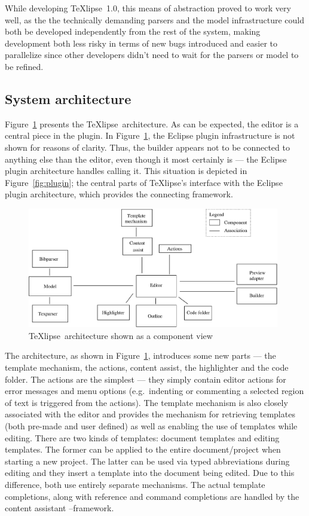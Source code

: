\documentclass[a4paper,11pt,twoside]{article}
\newcommand{\texlipse}{\TeX lipse}
\begin{document}
While developing \texlipse\ 1.0, this means of abstraction proved to work very
well, as the the technically demanding parsers and the model infrastructure
could both be developed independently from the rest of the system, making
development both less risky in terms of new bugs introduced and easier to
parallelize since other developers didn't need to wait for the parsers or model
to be refined.


\subsection{System architecture}

Figure~\ref{fig:arch} presents the \texlipse\ architecture. As can be expected, 
the editor is a central piece in the plugin. In Figure~\ref{fig:arch}, the 
Eclipse plugin infrastructure is not shown for reasons of clarity. Thus, the 
builder appears not to be connected to anything else than the editor, even 
though it most certainly is --- the Eclipse plugin architecture handles calling 
it. This situation is depicted in Figure~\ref{fig:plugin}; the central parts of 
\texlipse's interface with the Eclipse plugin architecture, which provides the 
connecting framework.

\begin{figure}[!htp]
\begin{center}
\includegraphics[width=11cm]{images/architecture}
\caption{\texlipse\ architecture shown as a component view}
\label{fig:arch}
\end{center}
\end{figure} 

The architecture, as shown in Figure~\ref{fig:arch}, introduces some new parts 
--- the template mechanism, the actions, content assist, the highlighter and 
the code folder. The actions are the simplest --- they simply contain editor 
actions for error messages and menu options (e.g.\ indenting or commenting a 
selected region of text is triggered from the actions). The template mechanism 
is also closely associated with the editor and provides the mechanism for 
retrieving templates (both pre-made and user defined) as well as enabling the 
use of templates while editing. There are two kinds of templates: document 
templates and editing templates. The former can be applied to the entire 
document/project when starting a new project. The latter can be used via typed 
abbreviations during editing and they insert a template into the document being 
edited. Due to this difference, both use entirely separate mechanisms. The 
actual template completions, along with reference and command completions are 
handled by the content assistant --framework.
\end{document}
